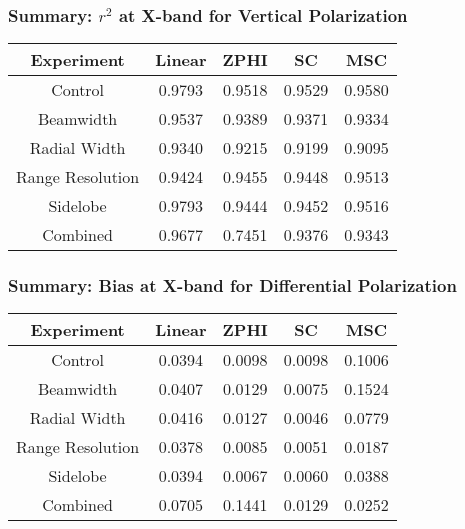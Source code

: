 \begin{frame}
    \frametitle{Summary: $r^2$ at X-band for Vertical Polarization}
    \begin{center}
        \begin{tabular}{| c | c | c | c | c |}
            \hline
            Experiment & Linear & ZPHI & SC & MSC \\
            \hline
            \hline
            Control & 0.9793 & 0.9518 & 0.9529 & 0.9580 \\
            Beamwidth & 0.9537 & 0.9389 & 0.9371 & 0.9334 \\
            Radial Width & 0.9340 & 0.9215 & 0.9199 & 0.9095 \\
            Range Resolution & 0.9424 & 0.9455 & 0.9448 & 0.9513 \\
            Sidelobe & 0.9793 & 0.9444 & 0.9452 & 0.9516 \\
            Combined & 0.9677 & 0.7451 & 0.9376 & 0.9343 \\
            \hline
        \end{tabular}
    \end{center}
\end{frame}

\begin{frame}
    \frametitle{Summary: Bias at X-band for Differential Polarization}
    \begin{center}
        \begin{tabular}{| c | c | c | c | c |}
            \hline
            Experiment & Linear & ZPHI & SC & MSC \\
            \hline
            \hline
            Control & 0.0394 & 0.0098 & 0.0098 & 0.1006 \\
            Beamwidth & 0.0407 & 0.0129 & 0.0075 & 0.1524 \\
            Radial Width & 0.0416 & 0.0127 & 0.0046 & 0.0779 \\
            Range Resolution & 0.0378 & 0.0085 & 0.0051 & 0.0187 \\
            Sidelobe & 0.0394 & 0.0067 & 0.0060 & 0.0388 \\
            Combined & 0.0705 & 0.1441 & 0.0129 & 0.0252 \\
            \hline
        \end{tabular}
    \end{center}
\end{frame}

